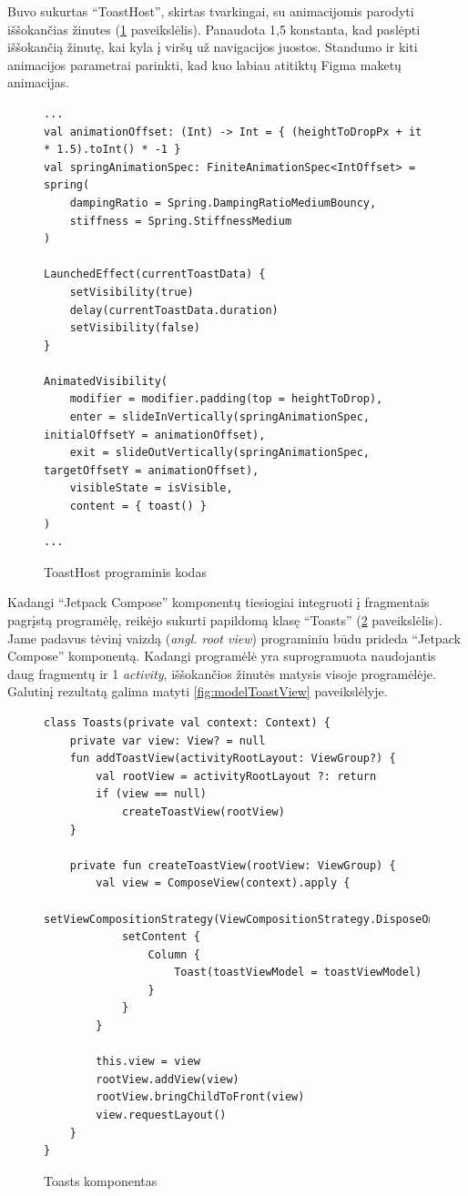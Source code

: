 \newpage
Buvo sukurtas \enquote{ToastHost}, skirtas tvarkingai, su animacijomis parodyti iššokančias žinutes  (\ref{fig:ToastHost} paveikslėlis). Panaudota 1,5 konstanta, kad paslėpti iššokančią žinutę, kai kyla į viršų už navigacijos juostos. Standumo ir kiti animacijos parametrai parinkti, kad kuo labiau atitiktų Figma maketų animacijas.

\begin{figure}[htbp!]
    \centering
    \begin{verbatim}
...
val animationOffset: (Int) -> Int = { (heightToDropPx + it * 1.5).toInt() * -1 }
val springAnimationSpec: FiniteAnimationSpec<IntOffset> = spring(
    dampingRatio = Spring.DampingRatioMediumBouncy,
    stiffness = Spring.StiffnessMedium
)

LaunchedEffect(currentToastData) {
    setVisibility(true)
    delay(currentToastData.duration)
    setVisibility(false)
}

AnimatedVisibility(
    modifier = modifier.padding(top = heightToDrop),
    enter = slideInVertically(springAnimationSpec, initialOffsetY = animationOffset),
    exit = slideOutVertically(springAnimationSpec, targetOffsetY = animationOffset),
    visibleState = isVisible,
    content = { toast() }
)
...
    \end{verbatim}
    \caption{ToastHost programinis kodas}
    \label{fig:ToastHost}
\end{figure}

\newpage
Kadangi \enquote{Jetpack Compose} komponentų tiesiogiai integruoti į fragmentais pagrįstą programėlę, reikėjo sukurti papildomą klasę \enquote{Toasts} (\ref{fig:Toasts} paveikslėlis). Jame padavus tėvinį vaizdą (\emph{angl. root view}) programiniu būdu prideda \enquote{Jetpack Compose} komponentą. Kadangi programėlė yra suprogramuota naudojantis daug fragmentų ir 1 \textit{activity}, iššokančios žinutės matysis visoje programėlėje. Galutinį rezultatą galima matyti \ref{fig:modelToastView} paveikslėlyje.

\begin{figure}[htbp!]
    \centering
    \begin{verbatim}
class Toasts(private val context: Context) {
    private var view: View? = null
    fun addToastView(activityRootLayout: ViewGroup?) {
        val rootView = activityRootLayout ?: return
        if (view == null)
            createToastView(rootView)
    }

    private fun createToastView(rootView: ViewGroup) {
        val view = ComposeView(context).apply {
        setViewCompositionStrategy(ViewCompositionStrategy.DisposeOnViewTreeLifecycleDestroyed)
            setContent {
                Column {
                    Toast(toastViewModel = toastViewModel)
                }
            }
        }

        this.view = view
        rootView.addView(view)
        rootView.bringChildToFront(view)
        view.requestLayout()
    }
}
\end{verbatim}
    \caption{Toasts komponentas}
    \label{fig:Toasts}
\end{figure}